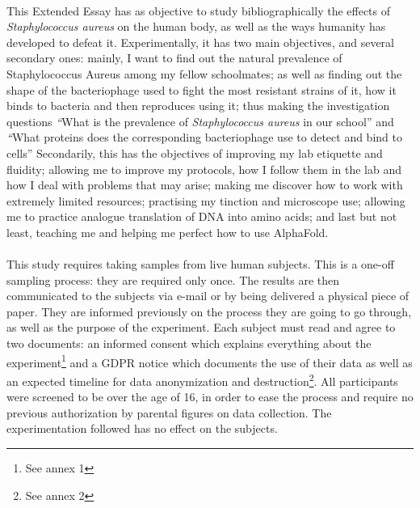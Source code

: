 \paragraph{}This Extended Essay has as objective to study bibliographically the effects of \emph{Staphylococcus aureus} on the human body, as well as the ways humanity has developed to defeat it. Experimentally, it has two main objectives, and several secondary ones: mainly, I want to find out the natural prevalence of Staphylococcus Aureus among my fellow schoolmates; as well as finding out the shape of the bacteriophage used to fight the most resistant strains of it, how it binds to bacteria and then reproduces using it; thus making the investigation questions \emph“What is the prevalence of \emph{Staphylococcus aureus} in our school” and \emph“What proteins does the corresponding bacteriophage use to detect and bind to cells” Secondarily, this has the objectives of improving my lab etiquette and fluidity; allowing me to improve my protocols, how I follow them in the lab and how I deal with problems that may arise; making me discover how to work with extremely limited resources; practising my tinction and microscope use; allowing me to practice analogue translation of DNA into amino acids; and last but not least, teaching me and helping me perfect how to use AlphaFold.

\paragraph{}This study requires taking samples from live human subjects. This is a one-off sampling process: they are required only once. The results are then communicated to the subjects via e-mail or by being delivered a physical piece of paper. They are informed previously on the process they are going to go through, as well as the purpose of the experiment. Each subject must read and agree to two documents: an informed consent which explains everything about the experiment\footnote{See annex 1} and a GDPR notice which documents the use of their data as well as an expected timeline for data anonymization and destruction\footnote{See annex 2}. All participants were screened to be over the age of 16, in order to ease the process and require no previous authorization by parental figures on data collection. The experimentation followed has no effect on the subjects.
